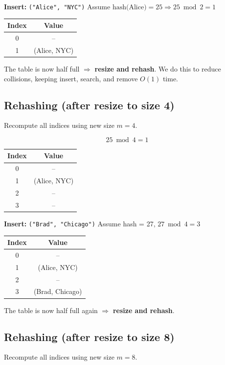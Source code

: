 \textbf{Insert:} \texttt{("Alice", "NYC")}  
Assume $\text{hash(Alice)} = 25 \Rightarrow 25 \bmod 2 = 1$

\begin{center}
\begin{tabular}{c c}
\toprule
Index & Value \\
\midrule
0 & -- \\
1 & (Alice, NYC) \\
\bottomrule
\end{tabular}
\end{center}

The table is now half full $\Rightarrow$ \textbf{resize and rehash}. We do this to reduce collisions, keeping insert, search, and remove $O(1)$ time.

\subsection{Rehashing (after resize to size 4)}
Recompute all indices using new size $m = 4$.

\[
25 \bmod 4 = 1
\]

\begin{center}
\begin{tabular}{c c}
\toprule
Index & Value \\
\midrule
0 & -- \\
1 & (Alice, NYC) \\
2 & -- \\
3 & -- \\
\bottomrule
\end{tabular}
\end{center}

\textbf{Insert:} \texttt{("Brad", "Chicago")}  
Assume hash = 27, $27 \bmod 4 = 3$

\begin{center}
\begin{tabular}{c c}
\toprule
Index & Value \\
\midrule
0 & -- \\
1 & (Alice, NYC) \\
2 & -- \\
3 & (Brad, Chicago) \\
\bottomrule
\end{tabular}
\end{center}

The table is now half full again $\Rightarrow$ \textbf{resize and rehash}.  

\subsection{Rehashing (after resize to size 8)}
Recompute all indices using new size $m = 8$.

